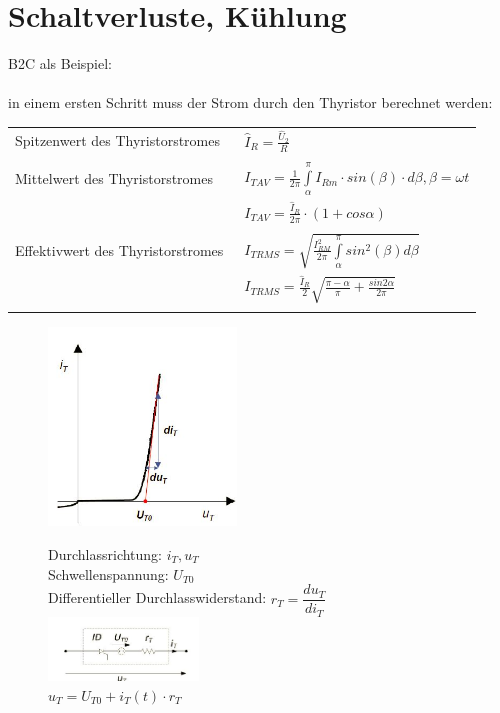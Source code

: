 	\section{Schaltverluste, Kühlung}
B2C als Beispiel:\\\\
in einem ersten Schritt muss der Strom durch den Thyristor berechnet werden:\\
\begin{tabular}{ll}
  Spitzenwert des Thyristorstromes&\ $\hat{I}_{R} = \frac{\hat{U}_{2}}{R}$\\\\
  Mittelwert des Thyristorstromes &\ $I_{T AV} = \frac{1}{2\pi}\int\limits_{\alpha}^{\pi}I_{Rm} \cdot sin(\beta) \cdot d\beta, \beta = \omega t$\\
  &\ $I_{T AV} = \frac{\hat{I}_{R}}{2\pi} \cdot (1+cos\alpha)$\\\\
  Effektivwert des Thyristorstromes &\ $I_{T RMS} = \sqrt{\frac{I_{RM}^2}{2\pi}\int\limits_{\alpha}^{\pi}sin^2(\beta)d\beta}$\\
  &\ $I_{T RMS} = \frac{\hat{I}_{R}}{2}\sqrt{\frac{\pi - \alpha}{\pi}+\frac{sin2\alpha}{2\pi}}$\\\\
\end{tabular}

\begin{figure}[htbp]
  \begin{minipage}[t]{6cm}
    \vspace{0pt}
    \centering
    \includegraphics[width = 5cm]{./pictures/kennlinieThyristor} 
  \end{minipage}
  \hfill
  \begin{minipage}[t]{6cm}
    \vspace{0pt}
    Durchlassrichtung: $i_{T}, u_{T}$\\
    Schwellenspannung: $U_{T0}$\\
    Differentieller Durchlasswiderstand: $r_{T} = \dfrac{du_{T}}{di_{T}}$\\
    \includegraphics[width = 4cm]{./pictures/schemaThyristor}\\
    $u_{T} = U_{T0}+i_{T}(t) \cdot r_{T}$
  \end{minipage}
\end{figure}

